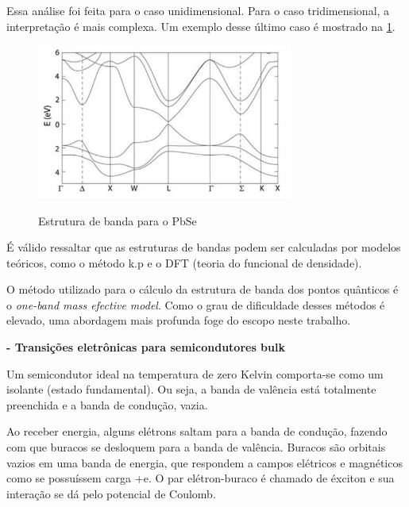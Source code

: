 		\par Essa análise foi feita para o caso unidimensional. Para o caso tridimensional, a interpretação é mais complexa. Um exemplo desse último caso é mostrado na \ref{fig7}.

		\begin{figure}[H]
	      \caption{Estrutura de banda para o PbSe}
	      \centering
	      \includegraphics[width=0.75\textwidth]{images/figura7.jpg}
	      \label{fig7}
	    \end{figure}

		\par É válido ressaltar que  as estruturas de bandas podem ser calculadas por modelos teóricos, como o método k.p e o DFT (teoria do funcional de densidade).

		\par O método utilizado para o cálculo da estrutura de banda dos pontos quânticos é o \textit{one-band mass efective model}\cite{bulk2}. Como o  grau de dificuldade desses métodos é elevado, uma abordagem mais profunda foge do escopo neste trabalho.

	\par \textbf{- Transições eletrônicas para semicondutores bulk}

		\par Um semicondutor ideal na temperatura de zero Kelvin comporta-se como um isolante (estado fundamental). Ou seja, a banda de valência está totalmente preenchida e a banda de condução, vazia.
 		
 		\par Ao receber energia, alguns elétrons saltam para a banda de condução, fazendo com que buracos se desloquem para a banda de valência\cite{bloch1}. Buracos são orbitais vazios em uma banda de energia, que respondem a campos elétricos e magnéticos como se possuíssem carga +e\cite{qm_fis6}. O par elétron-buraco é chamado de éxciton e sua interação se dá pelo potencial de Coulomb\cite{bloch1}.

